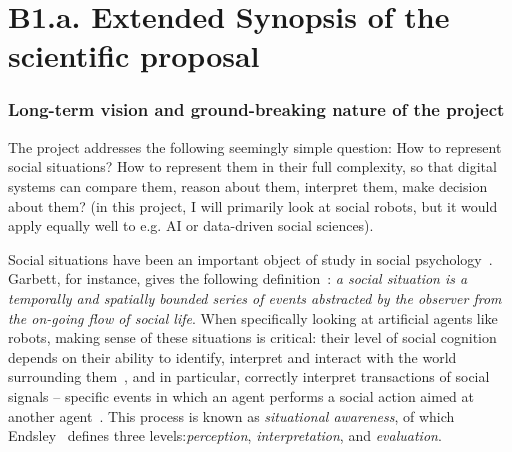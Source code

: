
\newrefsection


\chapter{B1.a. Extended Synopsis of the scientific proposal}\label{part1}




\subsection{Long-term vision and ground-breaking nature of the project}

The \project project addresses the following seemingly simple question: How to
represent social situations? How to represent them in their full complexity, so
that digital systems can compare them, reason about them, interpret them,
make decision about them? (in this project, I will primarily look at social
robots, but it would apply equally well to e.g. AI or data-driven social
sciences).

Social situations have been an important object of study in social
psychology~\cite{argyle1981social}. Garbett, for instance, gives
the following definition~\cite{garbett1970analysis}: \emph{a social situation is
a temporally and spatially bounded series of events abstracted by the observer
from the on-going flow of social life}. When specifically looking at artificial
agents like robots, making sense of these situations is critical: their level of
social cognition depends on their ability to identify, interpret and interact
with the world surrounding them~\cite{szczepanowski2017computational}, and in
particular, correctly interpret transactions of social signals -- specific
events in which an agent performs a social action aimed at another
agent~\cite{pantic2011social}. This process is known as \textit{situational
awareness}, of which Endsley~\cite{endsley1995theory} defines three
levels:\emph{perception}, \emph{interpretation}, and \emph{evaluation}.

